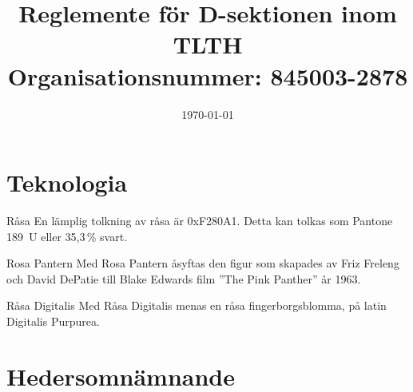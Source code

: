 \documentclass[pdfbookmarks,a4paper,11pt]{article}
\title{Reglemente för D-sektionen inom TLTH\\ Organisationsnummer: 845003-2878}
\date{\today}
\newlength{\itemcollength}
\newenvironment{reglemlista}{%
  \begin{list}{}{%
      \setlength{\labelwidth}{\itemcollength}%
      \setlength{\leftmargin}{\labelwidth + \labelsep}%
      \renewcommand{\makelabel}[1]{%
        \raisebox{0pt}[1ex][0pt]{%
          \makebox[\labelwidth][l]{%
            \parbox[t]{\itemcollength}{%
              \raggedright\hspace{0pt}##1}}}\hfill}%
      }}{%
  \end{list}}
\begin{document}
\maketitle

\section{Teknologia}

\begin{reglemlista}

	\item[Råsa]
	En lämplig tolkning av råsa är 0xF280A1. Detta kan tolkas som Pantone
	189~U eller 35,3\,\% svart.

	\item[Rosa Pantern]
	Med Rosa Pantern åsyftas den figur som skapades av Friz Freleng och David
	DePatie till Blake Edwards film ''The Pink Panther'' år 1963.

	\item[Råsa Digitalis]
	Med Råsa Digitalis menas en råsa fingerborgsblomma, på latin Digitalis Purpurea.

\end{reglemlista}

\section{Hedersomnämnande}
\end{document}
